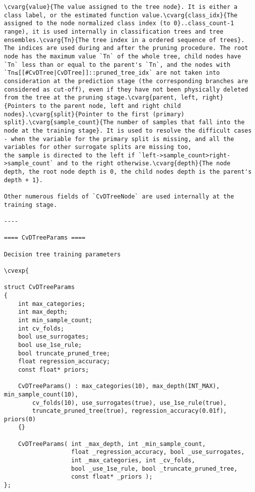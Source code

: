 \begin{verbatim}
\cvarg{value}{The value assigned to the tree node}. It is either a class label, or the estimated function value.\cvarg{class_idx}{The assigned to the node normalized class index (to 0}..class_count-1 range), it is used internally in classification trees and tree ensembles.\cvarg{Tn}{The tree index in a ordered sequence of trees}. The indices are used during and after the pruning procedure. The root node has the maximum value `Tn` of the whole tree, child nodes have `Tn` less than or equal to the parent's `Tn`, and the nodes with `Tn≤[[#CvDTree|CvDTree]]::pruned_tree_idx` are not taken into consideration at the prediction stage (the corresponding branches are considered as cut-off), even if they have not been physically deleted from the tree at the pruning stage.\cvarg{parent, left, right}{Pointers to the parent node, left and right child nodes}.\cvarg{split}{Pointer to the first (primary) split}.\cvarg{sample_count}{The number of samples that fall into the node at the training stage}. It is used to resolve the difficult cases - when the variable for the primary split is missing, and all the variables for other surrogate splits are missing too,
the sample is directed to the left if `left->sample_count>right->sample_count` and to the right otherwise.\cvarg{depth}{The node depth, the root node depth is 0, the child nodes depth is the parent's depth + 1}.

Other numerous fields of `CvDTreeNode` are used internally at the training stage.

----

==== CvDTreeParams ====

Decision tree training parameters

\cvexp{

struct CvDTreeParams
{
    int max_categories;
    int max_depth;
    int min_sample_count;
    int cv_folds;
    bool use_surrogates;
    bool use_1se_rule;
    bool truncate_pruned_tree;
    float regression_accuracy;
    const float* priors;

    CvDTreeParams() : max_categories(10), max_depth(INT_MAX), min_sample_count(10),
        cv_folds(10), use_surrogates(true), use_1se_rule(true),
        truncate_pruned_tree(true), regression_accuracy(0.01f), priors(0)
    {}

    CvDTreeParams( int _max_depth, int _min_sample_count,
                   float _regression_accuracy, bool _use_surrogates,
                   int _max_categories, int _cv_folds,
                   bool _use_1se_rule, bool _truncate_pruned_tree,
                   const float* _priors );
};


\end{verbatim}
